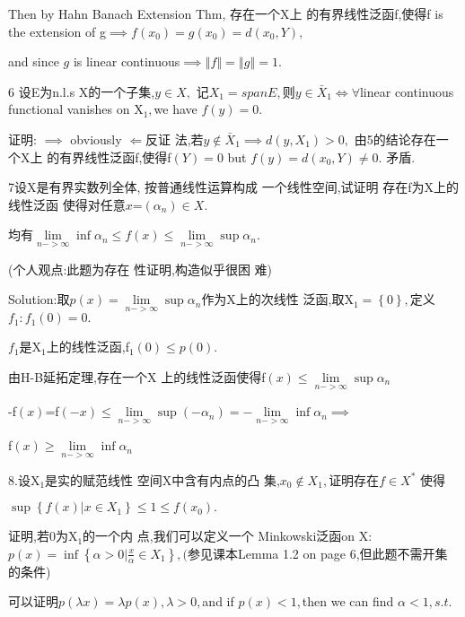 \documentclass{ctexart}
\begin{document}
Then by Hahn Banach Extension Thm, 存在一个X上%
的有界线性泛函f,使得f
is the extension of g$\implies f\left( x_{0}\right) =g\left( x_{0}\right)
=d\left( x_{0},Y\right) ,$

and since $g$ is linear continuous$\implies \left\Vert f\right\Vert
=\left\Vert g\right\Vert =1.$

6 设E为n.l.s X的一个子集,$y\in X,$%
记$X_{1}=spanE,$则$y\in \bar{X}_{1}\iff \forall $linear
continuous functional vanishes on X$_{1},$we have $f\left( y\right) =0.$

证明: $\implies $ obviously $\Longleftarrow $反证%
法,若$y\notin \bar{X}_{1}\implies d\left( y,X_{1}\right) >0,$%
由5的结论存在一个X上%
的有界线性泛函f,使得f$%
\left( Y\right) =0$ but $f\left( y\right) =d\left( x_{0},Y\right) \neq 0.$%
矛盾.

7设X是有界实数列全体,%
按普通线性运算构成%
一个线性空间,试证明%
存在f为X上的线性泛函%
使得对任意$x$=$\left( \alpha _{n}\right) \in
X. $

均有$\underset{n->\infty }{\lim }\inf \alpha _{n}\leq f\left(
x\right) \leq \underset{n->\infty }{\lim }\sup \alpha _{n}.$

(个人观点:此题为存在%
性证明,构造似乎很困%
难)

Solution:\bigskip 取$p\left( x\right) =\underset{n->\infty }{\lim }%
\sup \alpha _{n}$作为X上的次线性%
泛函,取X$_{1}=\left\{ 0\right\} ,$定义$%
f_{1}:f_{1}\left( 0\right) =0.$

$f_{1}$是X$_{1}$上的线性泛函,f$%
_{1}\left( 0\right) \leq p\left( 0\right) .$

由H-B延拓定理,存在一个X%
上的线性泛函使得f$\left(
x\right) \leq \underset{n->\infty }{\lim }\sup \alpha _{n}$

-f$\left( x\right) $=f$\left( -x\right) \leq \underset{n->\infty }{\lim }%
\sup \left( -\alpha _{n}\right) =-\underset{n->\infty }{\lim }\inf \alpha
_{n}\implies $

f$\left( x\right) \geq \underset{n->\infty }{\lim }\inf \alpha _{n}$

8.设X$_{1}$是实的赋范线性%
空间X中含有内点的凸%
集,$x_{0}\notin X_{1},$证明存在$f\in X^{\ast }$%
使得

$\sup \left\{ f\left( x\right) |x\in X_{1}\right\} \leq 1\leq f\left(
x_{0}\right) .$

证明,若0为X$_{1}$的一个内%
点,我们可以定义一个%
Minkowski泛函on X: $p\left( x\right) =\inf \left\{ \alpha >0|%
\frac{x}{\alpha }\in X_{1}\right\} ,($参见课本Lemma
1.2 on page 6,但此题不需开集%
的条件)

\bigskip 可以证明$p\left( \lambda x\right) =\lambda
p\left( x\right) ,\lambda >0,$and if $p\left( x\right) <1,$then we can find $%
\alpha <1,s.t.$
\end{document}
